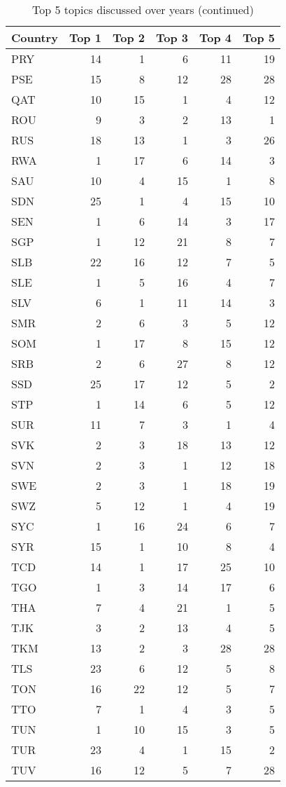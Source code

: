     
    
    \begin{table}
    \centering
    \caption{Top 5 topics discussed over years (continued)}
    \label{tab:top 5 topics all5}
    \begin{tabular}{lrrrrr}
    \toprule
    Country &     Top 1 &     Top 2 &     Top 3 &     Top 4 &     Top 5 \\
    \midrule
    PRY  & 14 & 1 & 6 & 11 & 19\\
    PSE  & 15 & 8 & 12 & 28 & 28\\
    QAT  & 10 & 15 & 1 & 4 & 12\\
    ROU  & 9 & 3 & 2 & 13 & 1\\
    RUS  & 18 & 13 & 1 & 3 & 26\\
    RWA  & 1 & 17 & 6 & 14 & 3\\
    SAU  & 10 & 4 & 15 & 1 & 8\\
    SDN  & 25 & 1 & 4 & 15 & 10\\
    SEN  & 1 & 6 & 14 & 3 & 17\\
    SGP  & 1 & 12 & 21 & 8 & 7\\
    SLB  & 22 & 16 & 12 & 7 & 5\\
    SLE  & 1 & 5 & 16 & 4 & 7\\
    SLV  & 6 & 1 & 11 & 14 & 3\\
    SMR  & 2 & 6 & 3 & 5 & 12\\
    SOM  & 1 & 17 & 8 & 15 & 12\\
    SRB  & 2 & 6 & 27 & 8 & 12\\
    SSD  & 25 & 17 & 12 & 5 & 2\\
    STP  & 1 & 14 & 6 & 5 & 12\\
    SUR  & 11 & 7 & 3 & 1 & 4\\
    SVK  & 2 & 3 & 18 & 13 & 12\\
    SVN  & 2 & 3 & 1 & 12 & 18\\
    SWE  & 2 & 3 & 1 & 18 & 19\\
    SWZ  & 5 & 12 & 1 & 4 & 19\\
    SYC  & 1 & 16 & 24 & 6 & 7\\
    SYR  & 15 & 1 & 10 & 8 & 4\\
    TCD  & 14 & 1 & 17 & 25 & 10\\
    TGO  & 1 & 3 & 14 & 17 & 6\\
    THA  & 7 & 4 & 21 & 1 & 5\\
    TJK  & 3 & 2 & 13 & 4 & 5\\
    TKM  & 13 & 2 & 3 & 28 & 28\\
    TLS  & 23 & 6 & 12 & 5 & 8\\
    TON  & 16 & 22 & 12 & 5 & 7\\
    TTO  & 7 & 1 & 4 & 3 & 5\\
    TUN  & 1 & 10 & 15 & 3 & 5\\
    TUR  & 23 & 4 & 1 & 15 & 2\\
    TUV  & 16 & 12 & 5 & 7 & 28\\
    \bottomrule
    \end{tabular}\end{table}
    
